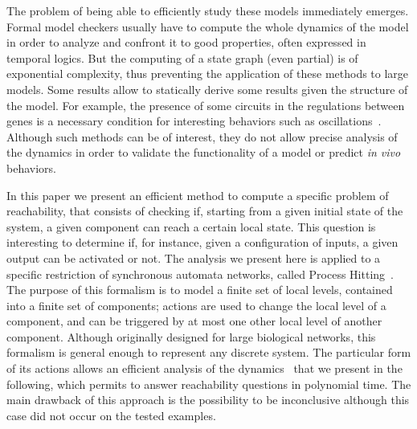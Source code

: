 \documentclass{movep}
\newcounter{la}
\newcommand{\ie}{i.e.\ }
\begin{document}
The problem of being able to efficiently study these models immediately emerges.
Formal model checkers usually have to compute the whole dynamics of the model
in order to analyze and confront it to good properties,
often expressed in temporal logics. %
But the computing of a state graph (even partial) is of exponential complexity,
thus preventing the application of these methods to large models.
Some results allow to statically derive some results given the structure of the model.
For example, the presence of some circuits in the regulations between genes
is a necessary condition for interesting behaviors such as oscillations~\cite{RiCo07}.
Although such methods can be of interest, they do not allow precise analysis of the dynamics
in order to validate the functionality of a model or predict \textit{in vivo} behaviors.

In this paper we present an efficient method to compute a specific problem of reachability,
that consists of checking if,
starting from a given initial state of the system,
a given component can reach a certain local state.
This question is interesting to determine if, for instance, given a configuration of inputs,
a given output can be activated or not.
The analysis we present here is applied to a specific restriction of synchronous automata networks,
called Process Hitting~\cite{PMR10-TCSB}.
The purpose of this formalism is to model a finite set of local levels,
contained into a finite set of components;
actions are used to change the local level of a component, and can be triggered by
at most one other local level of another component.
Although originally designed for large biological networks,
this formalism is general enough to represent any discrete system.
The particular form of its actions allows an efficient analysis of the
dynamics~\cite{PMR12-MSCS,FPMR13-CS2Bio}
that we present in the following,
which permits to answer reachability questions in polynomial time.
The main drawback of this approach is the possibility to be inconclusive
although this case did not occur on the tested examples.
\end{document}
